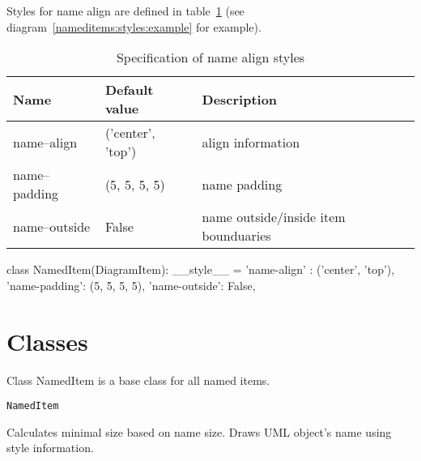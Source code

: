 \documentclass{book}
\newlength{\dscwidth}
\newcommand{\dlabel}[1]{\par\noindent\makebox[6em][r]{\textbf{#1:}}\hspace{1em}}
\newenvironment{entitydesc}{%
\dlabel{Description}%
\begin{minipage}[t]{\dscwidth}
}{%
\end{minipage}
}
\newenvironment{class}[1]{%
\dlabel{\underline{Class}}\texttt{#1}\nopagebreak[4]
}{%
\par\vspace{2em}
}
\begin{document}
Styles for name align are defined in table~\ref{nameditems:styles:spec}
(see diagram~\ref{nameditems:styles:example} for example).

\begin{table}
\begin{center}
\begin{tabular}{|l|l|l|}
\hline
Name           & Default value     & Description \\
\hline
name--align    & ('center', 'top') & align information \\
name--padding  & (5, 5, 5, 5)      & name padding \\
name--outside  & False             & name outside/inside item bounduaries \\
\hline
\end{tabular}
\caption{Specification of name align styles}\label{nameditems:styles:spec}
\end{center}
\end{table}

\begin{code}
\begin{pylst}
class NamedItem(DiagramItem):
    __style__ = {
        'name-align' : ('center', 'top'),
        'name-padding': (5, 5, 5, 5),
        'name-outside': False,
    }
\end{pylst}
\caption{Named items style example}\label{nameditems:styles:example}
\end{code}

\section{Classes}
Class NamedItem is a base class for all named items.

\begin{class}{NamedItem}
\begin{entitydesc}
Calculates minimal size based on name size. Draws UML object's name using
style information.
\end{entitydesc}
\end{class}

\end{document}

